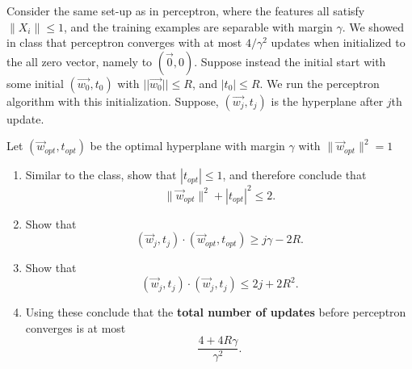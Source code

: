 \documentclass[11pt]{article}
\newenvironment{problem}[2][Problem]{\begin{trivlist}
\item[\hskip \labelsep {\bfseries #1}\hskip \labelsep {\bfseries #2.}]}{\end{trivlist}}
\begin{document}
\begin{problem}{ 2. (15 points)}
Consider the same set-up as in perceptron, where the features all satisfy $\|X_i \|\le 1$, and the training examples are separable with margin $\gamma$. We showed in class that perceptron converges with at most $4/\gamma^2$ updates when initialized to the all zero vector, namely to $(\vec 0, 0)$. Suppose instead the initial start with some initial $(\vec {w_0}, t_0)$ with $\lvert\lvert \vec {w_0}\rvert \rvert \le R$, and $|t_0|\le R$. We run the perceptron algorithm with this initialization. Suppose, $(\vec {w_j}, t_j)$ is the hyperplane after $j$th update.


Let $(\vec{w}_{opt}, t_{opt})$ be the optimal hyperplane with margin $\gamma$ with $\|\vec{w}_{opt}\|^2 = 1$
\begin{enumerate}
\item 
Similar to the class, show that $|t_{opt}| \le 1$, and therefore conclude that 
\[
\|\vec{w}_{opt}\|^2+|t_{opt}|^2 \le 2. 
\]
\item Show that 
\[
(\vec{w}_{j}, t_{j})\cdot (\vec{w}_{opt}, t_{opt})\ge j\gamma-2R.
\]
\item Show that 
\[
(\vec{w}_{j}, t_{j})\cdot (\vec{w}_{j}, t_{j})\le 2j+2R^2.
\]
\item
Using these conclude that the \textbf{total number of updates} before perceptron converges is at most
\[
\frac{4+4R\gamma}{\gamma^2}.
\]
\end{enumerate}

\end{problem}
\end{document}
